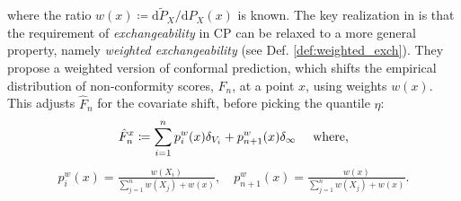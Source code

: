 where the ratio $w(x)\coloneqq\mathrm{d}\tilde{P}_{X}/\mathrm{d}P_{X}(x)$ is known.
The key realization in \cite{tibshirani2020conformal} is that the requirement of \textit{exchangeability} in CP can be relaxed to a more general property, namely \textit{weighted exchangeability} (see Def. \ref{def:weighted_exch}). 
They propose a weighted version of conformal prediction, which shifts the empirical distribution of non-conformity scores, $\hat{F}_{n}$, at a point $x$, using weights $w(x)$. This adjusts $\hat{F}_{n}$ for the covariate shift, before picking the quantile $\eta$: $$\hat{F}_{n}^{x} \coloneqq  \sum_{i=1}^n p_i^w(x) \delta_{V_i} + p_{n+1}^w(x)\delta_{\infty}\quad \textup{ where,}$$ 
\begin{align*}
    p_i^{w}(x) = \frac{w(X_i)}{\sum_{j=1}^n w(X_j) + w(x)}, \quad p_{n+1}^{w}(x) = \frac{w(x)}{\sum_{j=1}^n w(X_j) + w(x)}.
\end{align*}





